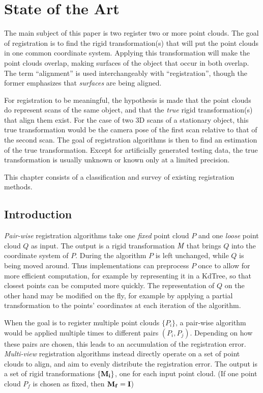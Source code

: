 \chapter{State of the Art} \label{ch:pcreg}
The main subject of this paper is two register two or more point clouds. The goal of registration is to find the rigid transformation(s) that will put the point clouds in one common coordinate system. Applying this transformation will make the point clouds overlap, making surfaces of the object that occur in both overlap. The term ``alignment'' is used interchangeably with ``registration'', though the former emphasizes that \emph{surfaces} are being aligned.

For registration to be meaningful, the hypothesis is made that the point clouds do represent scans of the same object, and that the \emph{true} rigid transformation(s) that align them exist. For the case of two 3D scans of a stationary object, this true transformation would be the camera pose of the first scan relative to that of the second scan. The goal of registration algorithms is then to find an estimation of the true transformation. Except for artificially generated testing data, the true transformation is usually unknown or known only at a limited precision.

This chapter consists of a classification and survey of existing registration methods.

\section{Introduction}

\emph{Pair-wise} registration algorithms take one \emph{fixed} point cloud $P$ and one \emph{loose} point cloud $Q$ as input. The output is a rigid transformation $\emph{M}$ that brings $Q$ into the coordinate system of $P$. During the algorithm $P$ is left unchanged, while $Q$ is being moved around. Thus implementations can preprocess $P$ once to allow for more efficient computation, for example by representing it in a KdTree, so that closest points can be computed more quickly. The representation of $Q$ on the other hand may be modified on the fly, for example by applying a partial transformation to the points' coordinates at each iteration of the algorithm.

When the goal is to register multiple point clouds $\{ P_i \}$, a pair-wise algorithm would be applied multiple times to different pairs $(P_i, P_j)$. Depending on how these pairs are chosen, this leads to an accumulation of the registration error. \emph{Multi-view} registration algorithms instead directly operate on a set of point clouds to align, and aim to evenly distribute the registration error. The output is a set of rigid transformations $\{ \mathbf{M_i} \}$, one for each input point cloud. (If one point cloud $P_f$ is chosen as fixed, then $\mathbf{M_f} = \mathbf{I}$)

